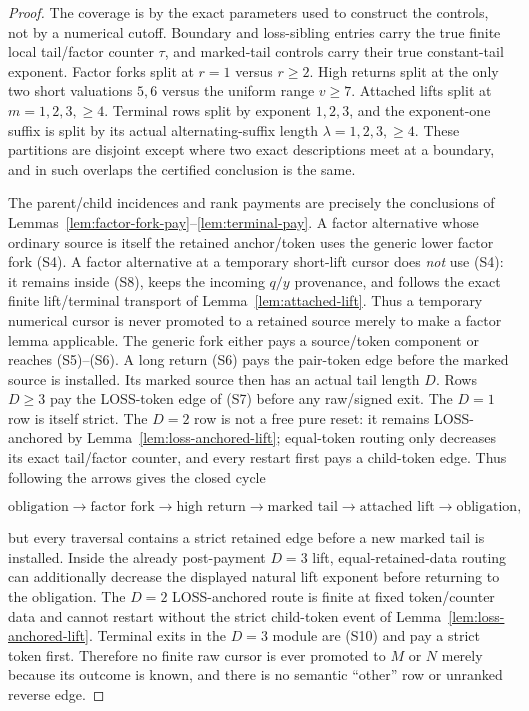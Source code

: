 \begin{proof}
The coverage is by the exact parameters used to construct the controls, not
by a numerical cutoff.  Boundary and loss-sibling entries carry the true
finite local tail/factor counter $\tau$, and marked-tail controls carry their
true constant-tail exponent.  Factor forks split at $r=1$ versus $r\ge2$.
High returns split at the only two short valuations $5,6$ versus the uniform
range $v\ge7$.  Attached lifts split at $m=1,2,3,\ge4$.  Terminal rows split by
exponent $1,2,3$, and the exponent-one suffix is split by its actual
alternating-suffix length $\lambda=1,2,3,\ge4$.  These partitions are
disjoint except where two exact descriptions meet at a boundary, and in such
overlaps the certified conclusion is the same.

The parent/child incidences and rank payments are precisely the conclusions
of Lemmas~\ref{lem:factor-fork-pay}--\ref{lem:terminal-pay}.  A factor
alternative whose ordinary source is itself the retained anchor/token uses
the generic lower factor fork (S4).  A factor alternative at a temporary
short-lift cursor does \emph{not} use (S4): it remains inside (S8), keeps the
incoming $q/y$ provenance, and follows the exact finite lift/terminal
transport of Lemma~\ref{lem:attached-lift}.  Thus a temporary numerical
cursor is never promoted to a retained source merely to make a factor lemma
applicable.  The generic fork either pays a source/token component or reaches
(S5)--(S6).  A long return (S6) pays the pair-token edge before the marked
source is installed.  Its marked source then has an actual tail length $D$.
Rows $D\ge3$ pay the LOSS-token edge of (S7) before any raw/signed exit.
The $D=1$ row is itself strict. The $D=2$ row is not a free pure reset: it
remains LOSS-anchored by Lemma~\ref{lem:loss-anchored-lift}; equal-token
routing only decreases its exact tail/factor counter, and every restart first
pays a child-token edge.  Thus following the arrows gives the
closed cycle

\[
  \text{obligation}\to\text{factor fork}\to\text{high return}
  \to\text{marked tail}\to\text{attached lift}\to\text{obligation},
\]

but every traversal contains a strict retained edge before a new marked tail
is installed.  Inside the already post-payment $D=3$ lift, equal-retained-data
routing can additionally decrease the displayed natural lift exponent before
returning to the obligation.  The $D=2$ LOSS-anchored route is finite at fixed token/counter data and
cannot restart without the strict child-token event of
Lemma~\ref{lem:loss-anchored-lift}. Terminal exits in the $D=3$ module
are (S10) and pay a strict token first.  Therefore no finite raw cursor is ever promoted to
$M$ or $N$ merely because its outcome is known, and there is no semantic
``other'' row or unranked reverse edge.
\end{proof}

